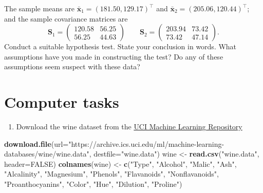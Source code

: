 \documentclass[]{book}
\newenvironment{Shaded}{\begin{snugshade}}{\end{snugshade}}
\newcommand{\DataTypeTok}[1]{\textcolor[rgb]{0.13,0.29,0.53}{#1}}
\newcommand{\KeywordTok}[1]{\textcolor[rgb]{0.13,0.29,0.53}{\textbf{#1}}}
\newcommand{\NormalTok}[1]{#1}
\newcommand{\OtherTok}[1]{\textcolor[rgb]{0.56,0.35,0.01}{#1}}
\newcommand{\StringTok}[1]{\textcolor[rgb]{0.31,0.60,0.02}{#1}}
\providecommand{\tightlist}{%
  \setlength{\itemsep}{0pt}\setlength{\parskip}{0pt}}
\theoremstyle{definition}
\theoremstyle{definition}
\theoremstyle{definition}
\theoremstyle{remark}
\begin{document}
\begin{enumerate}
  The sample means are \(\bar{\mathbf x}_1 = (181.50,129.17)^\top\) and \(\bar{\mathbf x}_2 = (205.06,120.44)^\top\); and the sample covariance matrices are
  \[\mathbf S_1 = \begin{pmatrix} 120.58 & 56.25 \\ 56.25 & 44.63 \end{pmatrix} \qquad
  \mathbf S_2 = \begin{pmatrix} 203.94 & 73.42 \\ 73.42 & 47.14 \end{pmatrix}.\]
  Conduct a suitable hypothesis test. State your conclusion in words. What assumptions have you made in constructing the test? Do any of these assumptions seem suspect with these data?
\end{enumerate}

\hypertarget{computer-tasks-2}{%
\section{Computer tasks}\label{computer-tasks-2}}

\begin{enumerate}
\def\labelenumi{\arabic{enumi}.}
\tightlist
\item
  Download the wine dataset from the \href{https://archive.ics.uci.edu/ml/datasets/wine}{UCI Machine Learning Repository}
\end{enumerate}

\begin{Shaded}
\begin{Highlighting}[]
\KeywordTok{download.file}\NormalTok{(}\DataTypeTok{url=}\StringTok{"https://archive.ics.uci.edu/ml/machine-learning-databases/wine/wine.data"}\NormalTok{, }\DataTypeTok{destfile=}\StringTok{"wine.data"}\NormalTok{)}
\NormalTok{wine <-}\StringTok{ }\KeywordTok{read.csv}\NormalTok{(}\StringTok{"wine.data"}\NormalTok{, }\DataTypeTok{header=}\OtherTok{FALSE}\NormalTok{)}
\KeywordTok{colnames}\NormalTok{(wine) <-}\StringTok{ }\KeywordTok{c}\NormalTok{(}\StringTok{"Type"}\NormalTok{, }\StringTok{"Alcohol"}\NormalTok{, }\StringTok{"Malic"}\NormalTok{,}
\StringTok{"Ash"}\NormalTok{,}
\StringTok{"Alcalinity"}\NormalTok{,}
\StringTok{"Magnesium"}\NormalTok{,}
\StringTok{"Phenols"}\NormalTok{,}
\StringTok{"Flavanoids"}\NormalTok{,}
\StringTok{"Nonflavanoids"}\NormalTok{,}
\StringTok{"Proanthocyanins"}\NormalTok{,}
\StringTok{"Color"}\NormalTok{,}
\StringTok{"Hue"}\NormalTok{,}
\StringTok{"Dilution"}\NormalTok{,}
\StringTok{"Proline"}\NormalTok{)}
\end{Highlighting}
\end{Shaded}
\end{document}
